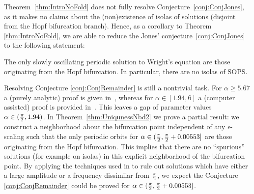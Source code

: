 Theorem~\ref{thm:IntroNoFold} does not fully resolve Conjecture~\ref{conj:ConjJones}, as it makes no claims about the (non)existence of isolas of solutions (disjoint from the Hopf bifurcation branch).
Hence, as a corollary to Theorem \ref{thm:IntroNoFold}, we are able to reduce the Jones' conjecture~\ref{conj:ConjJones} to the following statement:
\begin{conjecture}
	The only slowly oscillating periodic solution to Wright's equation are those originating from the Hopf bifurcation. In particular, there are no isolas of SOPS.	
	\label{conj:ConjRemainder}
\end{conjecture}

Resolving Conjecture \ref{conj:ConjRemainder} is still a nontrivial task.
For $\alpha \geq 5.67$ a (purely analytic) proof is given in~\cite{xie1991thesis}, whereas for $\alpha \in [1.94,6]$ a (computer assisted) proof is provided in~\cite{jlm2016Floquet}. This leaves a gap of parameter values $\alpha \in (\tfrac{\pi}{2}, 1.94)$. 
In Theorem~\ref{thm:UniqunessNbd2} we prove a partial result: we construct a neighborhood about the bifurcation point independent of any $ \epsilon$-scaling such that the only periodic orbits for 
$\alpha \in ( \tfrac{\pi}{2} , \tfrac{\pi}{2} + 0.00553]$
are those originating from the Hopf bifurcation.
This implies that there are no ``spurious'' solutions (for example on isolas) 
in this explicit neighborhood of the bifurcation point. 
By applying the techniques used in \cite{neumaier2014global,jlm2016Floquet}  to rule out solutions which have either a large amplitude or a frequency dissimilar from $\tfrac{\pi}{2}$, we expect the Conjecture  \ref{conj:ConjRemainder}  could be proved for 
$ \alpha \in ( \tfrac{\pi}{2} , \tfrac{\pi}{2} + 0.00553]$. 


